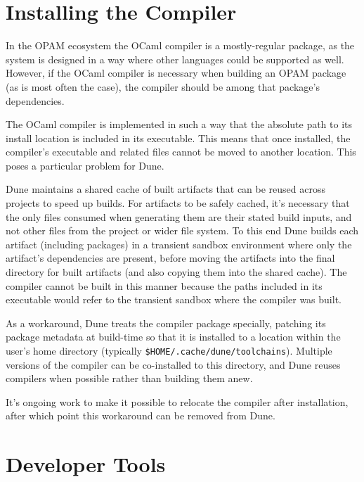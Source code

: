 \documentclass{article}
\begin{document}
\begin{multicols}{2}
        \section {Installing the Compiler}

	In the OPAM ecosystem the OCaml compiler is a mostly-regular package,
	as the system is designed in a way where other languages could be
	supported as well. However, if the OCaml compiler is necessary when
	building an OPAM package (as is most often the case), the compiler should be
	among that package's dependencies.

        The OCaml compiler is implemented in such a way that the absolute path
        to its install location is included in its executable. This means that
        once installed, the compiler's executable and related files cannot be
        moved to another location. This poses a particular problem for Dune.

        Dune maintains a shared cache of built artifacts that can be reused
        across projects to speed up builds. For artifacts to be safely cached,
        it's necessary that the only files consumed when generating them are
        their stated build inputs, and not other files from the project or wider
        file system. To this end Dune builds each artifact (including packages)
        in a transient sandbox environment where only the artifact's
        dependencies are present, before moving the artifacts into the final
        directory for built artifacts (and also copying them into the shared
        cache). The compiler cannot be built in this manner because the paths
        included in its executable would refer to the transient sandbox where
        the compiler was built.

        As a workaround, Dune treats the compiler package specially, patching
        its package metadata at build-time so that it is installed to a location
        within the user's home directory (typically
        \texttt{\$HOME/.cache/dune/toolchains}). Multiple versions of the
        compiler can be co-installed to this directory, and Dune reuses
        compilers when possible rather than building them anew.

        It's ongoing work to make it possible to relocate the compiler after
        installation, after which point this workaround can be removed from
        Dune.

        \section {Developer Tools}


\end{multicols}
\end{document}
